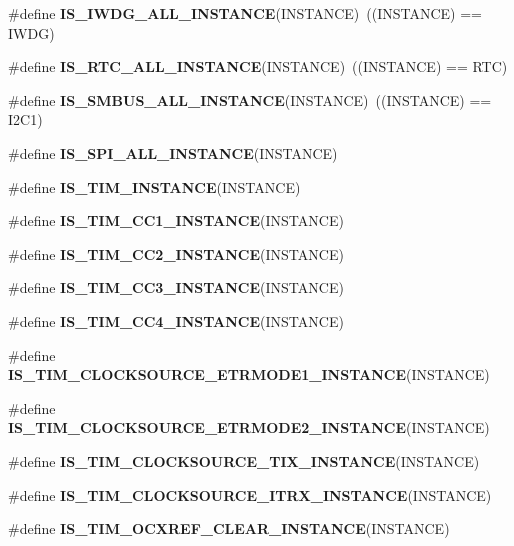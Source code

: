 \begin{DoxyCompactItemize}
\#define {\bfseries I\+S\+\_\+\+I\+W\+D\+G\+\_\+\+A\+L\+L\+\_\+\+I\+N\+S\+T\+A\+N\+CE}(I\+N\+S\+T\+A\+N\+CE)~((I\+N\+S\+T\+A\+N\+CE) == I\+W\+DG)
\item 
\mbox{\label{group___exported__macro_gab4230e8bd4d88adc4250f041d67375ce}} 
\#define {\bfseries I\+S\+\_\+\+R\+T\+C\+\_\+\+A\+L\+L\+\_\+\+I\+N\+S\+T\+A\+N\+CE}(I\+N\+S\+T\+A\+N\+CE)~((I\+N\+S\+T\+A\+N\+CE) == R\+TC)
\item 
\mbox{\label{group___exported__macro_gaf492fcfe71eab8d1dadf4d837b840af6}} 
\#define {\bfseries I\+S\+\_\+\+S\+M\+B\+U\+S\+\_\+\+A\+L\+L\+\_\+\+I\+N\+S\+T\+A\+N\+CE}(I\+N\+S\+T\+A\+N\+CE)~((I\+N\+S\+T\+A\+N\+CE) == I2\+C1)
\item 
\#define {\bfseries I\+S\+\_\+\+S\+P\+I\+\_\+\+A\+L\+L\+\_\+\+I\+N\+S\+T\+A\+N\+CE}(I\+N\+S\+T\+A\+N\+CE)
\item 
\#define {\bfseries I\+S\+\_\+\+T\+I\+M\+\_\+\+I\+N\+S\+T\+A\+N\+CE}(I\+N\+S\+T\+A\+N\+CE)
\item 
\#define {\bfseries I\+S\+\_\+\+T\+I\+M\+\_\+\+C\+C1\+\_\+\+I\+N\+S\+T\+A\+N\+CE}(I\+N\+S\+T\+A\+N\+CE)
\item 
\#define {\bfseries I\+S\+\_\+\+T\+I\+M\+\_\+\+C\+C2\+\_\+\+I\+N\+S\+T\+A\+N\+CE}(I\+N\+S\+T\+A\+N\+CE)
\item 
\#define {\bfseries I\+S\+\_\+\+T\+I\+M\+\_\+\+C\+C3\+\_\+\+I\+N\+S\+T\+A\+N\+CE}(I\+N\+S\+T\+A\+N\+CE)
\item 
\#define {\bfseries I\+S\+\_\+\+T\+I\+M\+\_\+\+C\+C4\+\_\+\+I\+N\+S\+T\+A\+N\+CE}(I\+N\+S\+T\+A\+N\+CE)
\item 
\#define {\bfseries I\+S\+\_\+\+T\+I\+M\+\_\+\+C\+L\+O\+C\+K\+S\+O\+U\+R\+C\+E\+\_\+\+E\+T\+R\+M\+O\+D\+E1\+\_\+\+I\+N\+S\+T\+A\+N\+CE}(I\+N\+S\+T\+A\+N\+CE)
\item 
\#define {\bfseries I\+S\+\_\+\+T\+I\+M\+\_\+\+C\+L\+O\+C\+K\+S\+O\+U\+R\+C\+E\+\_\+\+E\+T\+R\+M\+O\+D\+E2\+\_\+\+I\+N\+S\+T\+A\+N\+CE}(I\+N\+S\+T\+A\+N\+CE)
\item 
\#define {\bfseries I\+S\+\_\+\+T\+I\+M\+\_\+\+C\+L\+O\+C\+K\+S\+O\+U\+R\+C\+E\+\_\+\+T\+I\+X\+\_\+\+I\+N\+S\+T\+A\+N\+CE}(I\+N\+S\+T\+A\+N\+CE)
\item 
\#define {\bfseries I\+S\+\_\+\+T\+I\+M\+\_\+\+C\+L\+O\+C\+K\+S\+O\+U\+R\+C\+E\+\_\+\+I\+T\+R\+X\+\_\+\+I\+N\+S\+T\+A\+N\+CE}(I\+N\+S\+T\+A\+N\+CE)
\item 
\#define {\bfseries I\+S\+\_\+\+T\+I\+M\+\_\+\+O\+C\+X\+R\+E\+F\+\_\+\+C\+L\+E\+A\+R\+\_\+\+I\+N\+S\+T\+A\+N\+CE}(I\+N\+S\+T\+A\+N\+CE)

\end{DoxyCompactItemize}
